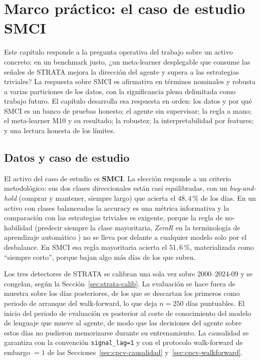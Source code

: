 \chapter{Marco práctico: el caso de estudio SMCI}
\label{cap:marco-practico}


Este capítulo responde a la pregunta operativa del trabajo sobre un activo concreto: en un benchmark justo, ¿un meta-learner desplegable que consume las señales de STRATA mejora la dirección del agente y supera a las estrategias triviales? La respuesta sobre SMCI es afirmativa en términos nominales y robusta a varias particiones de los datos, con la significancia plena delimitada como trabajo futuro. El capítulo desarrolla esa respuesta en orden: los datos y por qué SMCI es un banco de pruebas honesto; el agente sin supervisar; la regla a mano; el meta-learner M10 y su resultado; la robustez; la interpretabilidad por features; y una lectura honesta de los límites.

\section{Datos y caso de estudio}
\label{sec:datos}

El activo del caso de estudio es \textbf{SMCI}. La elección responde a un criterio metodológico: sus dos clases direccionales están casi equilibradas, con un \emph{buy-and-hold} (comprar y mantener, siempre largo) que acierta el $48{,}4\,\%$ de los días. En un activo con clases balanceadas la accuracy es una métrica informativa y la comparación con las estrategias triviales es exigente, porque la regla de no-habilidad (predecir siempre la clase mayoritaria, \emph{ZeroR} en la terminología de aprendizaje automático \cite{witten2016datamining, kuhn2008caret}) no se lleva por delante a cualquier modelo solo por el desbalance. En SMCI esa regla mayoritaria acierta el $51{,}6\,\%$, materializada como ``siempre corto'', porque bajan algo más días de los que suben.

Los tres detectores de STRATA se calibran una sola vez sobre 2000--2024-09 y se congelan, según la Sección~\ref{sec:strata-calib}. La evaluación se hace fuera de muestra sobre los días posteriores, de los que se descartan los primeros como periodo de arranque del walk-forward, lo que deja $n = 250$ días puntuables. El inicio del periodo de evaluación es posterior al corte de conocimiento del modelo de lenguaje que mueve al agente, de modo que las decisiones del agente sobre estos días no pudieron memorizarse durante su entrenamiento. La causalidad se garantiza con la convención \texttt{signal\_lag=1} y con el protocolo walk-forward de embargo $=1$ de las Secciones~\ref{sec:cpcv-causalidad} y~\ref{sec:cpcv-walkforward}.


